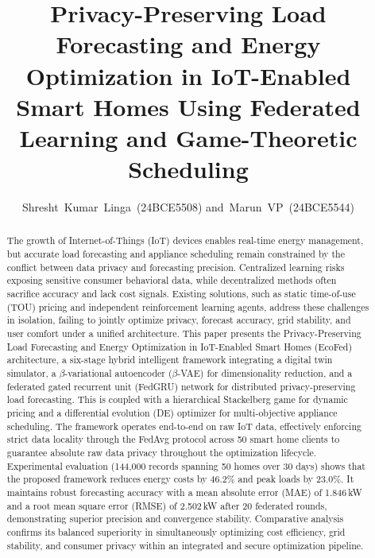 \documentclass[journal]{IEEEtran}
\begin{document}
\title{Privacy-Preserving Load Forecasting and Energy Optimization in IoT-Enabled Smart Homes Using Federated Learning and Game-Theoretic Scheduling}

\author{Shresht~Kumar~Linga~(24BCE5508)
        and~Marun~VP~(24BCE5544)%
}


\maketitle

\begin{abstract}
The growth of Internet-of-Things (IoT) devices enables real-time energy management, but accurate load forecasting and appliance scheduling remain constrained by the conflict between data privacy and forecasting precision. Centralized learning risks exposing sensitive consumer behavioral data, while decentralized methods often sacrifice accuracy and lack cost signals. Existing solutions, such as static time-of-use (TOU) pricing and independent reinforcement learning agents, address these challenges in isolation, failing to jointly optimize privacy, forecast accuracy, grid stability, and user comfort under a unified architecture. This paper presents the Privacy-Preserving Load Forecasting and Energy Optimization in IoT-Enabled Smart Homes (EcoFed) architecture, a six-stage hybrid intelligent framework integrating a digital twin simulator, a $\beta$-variational autoencoder ($\beta$-VAE) for dimensionality reduction, and a federated gated recurrent unit (FedGRU) network for distributed privacy-preserving load forecasting. This is coupled with a hierarchical Stackelberg game for dynamic pricing and a differential evolution (DE) optimizer for multi-objective appliance scheduling. The framework operates end-to-end on raw IoT data, effectively enforcing strict data locality through the FedAvg protocol across 50 smart home clients to guarantee absolute raw data privacy throughout the optimization lifecycle. Experimental evaluation (144,000 records spanning 50 homes over 30 days) shows that the proposed framework reduces energy costs by 46.2\% and peak loads by 23.0\%. It maintains robust forecasting accuracy with a mean absolute error (MAE) of 1.846\,kW and a root mean square error (RMSE) of 2.502\,kW after 20 federated rounds, demonstrating superior precision and convergence stability. Comparative analysis confirms its balanced superiority in simultaneously optimizing cost efficiency, grid stability, and consumer privacy within an integrated and secure optimization pipeline.
\end{abstract}
\end{document}
